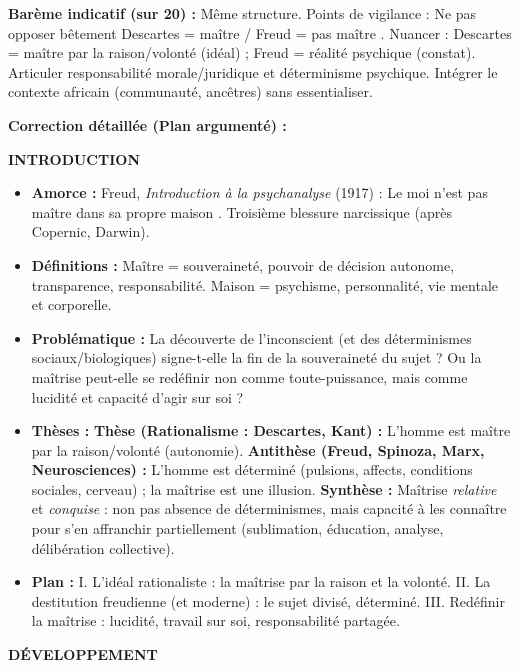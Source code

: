 \documentclass[11pt]{article}
\newcommand{\cle}[1]{{\popxbold\color{popdark}#1}}
\begin{document}
\begin{corrige}
\textbf{Barème indicatif (sur 20) :} Même structure. Points de vigilance : Ne pas opposer bêtement \guillemotleft Descartes = maître \guillemotright / \guillemotleft Freud = pas maître \guillemotright. Nuancer : Descartes = maître par la \cle{raison/volonté} (idéal) ; Freud = \cle{réalité psychique} (constat). Articuler responsabilité morale/juridique et déterminisme psychique. Intégrer le contexte africain (communauté, ancêtres) sans essentialiser.

\textbf{Correction détaillée (Plan argumenté) :}

\textbf{INTRODUCTION}
\begin{itemize}
\item \textbf{Amorce :} Freud, \emph{Introduction à la psychanalyse} (1917) : \guillemotleft Le moi n'est pas maître dans sa propre maison \guillemotright. Troisième blessure narcissique (après Copernic, Darwin).
\item \textbf{Définitions :} \cle{Maître} = souveraineté, pouvoir de décision autonome, transparence, responsabilité. \cle{Maison} = psychisme, personnalité, vie mentale et corporelle.
\item \textbf{Problématique :} La découverte de l'inconscient (et des déterminismes sociaux/biologiques) signe-t-elle la fin de la souveraineté du sujet ? Ou la maîtrise peut-elle se redéfinir non comme toute-puissance, mais comme \cle{lucidité} et \cle{capacité d'agir sur soi} ?
\item \textbf{Thèses :} \textbf{Thèse (Rationalisme : Descartes, Kant) :} L'homme est maître par la raison/volonté (autonomie). \textbf{Antithèse (Freud, Spinoza, Marx, Neurosciences) :} L'homme est déterminé (pulsions, affects, conditions sociales, cerveau) ; la maîtrise est une illusion. \textbf{Synthèse :} Maîtrise \emph{relative} et \emph{conquise} : non pas absence de déterminismes, mais \cle{capacité à les connaître pour s'en affranchir partiellement} (sublimation, éducation, analyse, délibération collective).
\item \textbf{Plan :} I. L'idéal rationaliste : la maîtrise par la raison et la volonté. II. La destitution freudienne (et moderne) : le sujet divisé, déterminé. III. Redéfinir la maîtrise : lucidité, travail sur soi, responsabilité partagée.
\end{itemize}

\textbf{DÉVELOPPEMENT}


\end{corrige}
\end{document}
